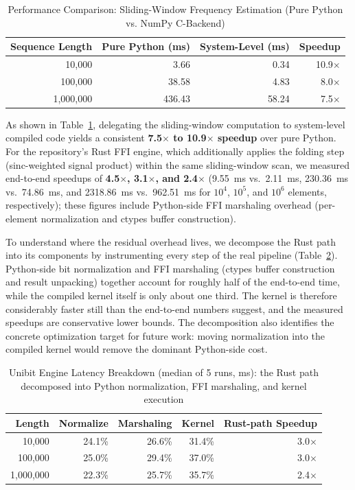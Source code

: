 ﻿\documentclass[12pt,a4paper]{article}
\begin{document}
\begin{table}[H]
\centering
\caption{Performance Comparison: Sliding-Window Frequency Estimation (Pure Python vs. NumPy C-Backend)}
\label{tab:performance}
\small
\begin{tabular}{@{}rrrr@{}}
\hline
\textbf{Sequence Length} & \textbf{Pure Python (ms)} & \textbf{System-Level (ms)} & \textbf{Speedup} \\
\hline
10,000 & 3.66 & 0.34 & 10.9$\times$ \\
100,000 & 38.58 & 4.83 & 8.0$\times$ \\
1,000,000 & 436.43 & 58.24 & 7.5$\times$ \\
\hline
\end{tabular}
\end{table}

As shown in Table~\ref{tab:performance}, delegating the sliding-window computation to system-level compiled code yields a consistent \textbf{7.5$\times$ to 10.9$\times$ speedup} over pure Python. For the repository's Rust FFI engine, which additionally applies the folding step (sinc-weighted signal product) within the same sliding-window scan, we measured end-to-end speedups of \textbf{4.5$\times$, 3.1$\times$, and 2.4$\times$} (9.55~ms vs.\ 2.11~ms, 230.36~ms vs.\ 74.86~ms, and 2318.86~ms vs.\ 962.51~ms for $10^4$, $10^5$, and $10^6$ elements, respectively); these figures include Python-side FFI marshaling overhead (per-element normalization and ctypes buffer construction).

To understand where the residual overhead lives, we decompose the Rust path into its components by instrumenting every step of the real pipeline (Table~\ref{tab:breakdown}). Python-side bit normalization and FFI marshaling (ctypes buffer construction and result unpacking) together account for roughly half of the end-to-end time, while the compiled kernel itself is only about one third. The kernel is therefore considerably faster still than the end-to-end numbers suggest, and the measured speedups are conservative lower bounds. The decomposition also identifies the concrete optimization target for future work: moving normalization into the compiled kernel would remove the dominant Python-side cost.

\begin{table}[H]
\centering
\caption{Unibit Engine Latency Breakdown (median of 5 runs, ms): the Rust path decomposed into Python normalization, FFI marshaling, and kernel execution}
\label{tab:breakdown}
\small
\begin{tabular}{@{}rrrrr@{}}
\hline
\textbf{Length} & \textbf{Normalize} & \textbf{Marshaling} & \textbf{Kernel} & \textbf{Rust-path Speedup} \\
\hline
10,000    & 24.1\% & 26.6\% & 31.4\% & 3.0$\times$ \\
100,000   & 25.0\% & 29.4\% & 37.0\% & 3.0$\times$ \\
1,000,000 & 22.3\% & 25.7\% & 35.7\% & 2.4$\times$ \\
\hline
\end{tabular}
\end{table}
\end{document}
